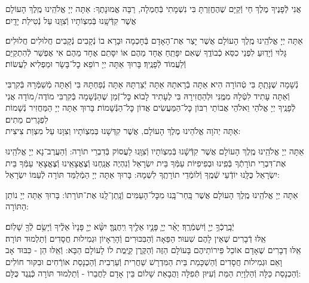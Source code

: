 \documentclass[twoside, openany, parskip=half, 11pt]{book}
\begin{document}
אֲנִי לְֿפָנֶיךָ מֶלֶךְ חַי וְֿקַיָּם שֶׁהֶחֱזַרְתָּ בִּי נִשְׁמָתִי בְּֿחֶמְלָה, רַבָּה אֱמוּנָתֶךָ:
אַתָּה יְיָ אֱלֹהֵֽינוּ מֶֽלֶךְ הָעוֹלָם אֲשֶׁר קִדְּֿשָֽׁנוּ בְּֿמִצְוֹתָיו וְֿצִוָּֽנוּ עַל נְֿטִילַת יָדָֽיִם׃

אַתָּה יְיָ אֱלֹהֵֽינוּ מֶֽלֶךְ הָעוֹלָם אֲשֶׁר יָצַר אֶת־הָאָדָם בְּֿחׇכְמָה וּבָרָא בוֹ נְֿקָבִים נְֿקָבִים חֲלוּלִים חֲלוּלִים׃ גָּלוּי וְֿיָדֽוּעַ לִפְנֵי כִסֵּא כְֿבוֹדֶֽךָ שֶׁאִם יִפָּתֵֽחַ אֶחָד מֵהֶם אוֹ יִסָּתֵם אֶחָד מֵהֶם אִי אֶפְשַׁר לְֿהִתְקַיֵּם וְֿלַעֲמוֹד לְֿפָנֶֽיךָ׃ בָּרוּךְ אַתָּה יְיָ רוֹפֵא כׇל־בָּשָׂר וּמַפְלִיא לַעֲשׂוֹת׃


נְֿשָׁמָה שֶׁנָּתַֽתָּ בִּי טְֿהוֹרָה הִיא׃ אַתָּה בְֿרָאתָהּ אַתָּה יְֿצַרְתָּהּ אַתָּה נְֿפַחְתָּהּ בִּי וְֿאַתָּה מְֿשַׁמְּֿרָהּ בְּֿקִרְבִּי וְֿאַתָּה עָתִיד לִטְּֿלָהּ מִמֶּֽנִּי וּלְהַחֲזִירָהּ בִּי לֶעָתִיד לָבוֹא׃ כׇּל־זְֿמַן שֶׁהַנְּֿשָׁמָה בְּֿקִרְבִּי מוֹדֶה/מוֹדָה אֲנִי לְֿפָנֶֽיךָ יְיָ אֱלֹהַי וֵאלֹהֵי אֲבוֹתַי רִבּוֹן כׇּל־הַמַּעֲשִׂים אֲדוֹן כׇּל־הַנְּֿשָׁמוֹת׃ בָּרוּךְ אַתָּה יְיָ הַמַּחֲזִיר נְֿשָׁמוֹת לִפְגָרִים מֵתִים׃\\
אַתָּה יְהֹוָה אֱלֹהֵינוּ מֶלֶךְ הָעוֹלָם, אֲשֶׁר קִדְּשָׁנוּ בְּמִצְוֹתָיו וְצִוָּנוּ עַל מִצְוַת צִיצִית:

אַתָּה יְיָ אֱלֹהֵֽינוּ מֶֽלֶךְ הָעוֹלָם אֲשֶׁר קִדְּֿשָֽֿׁנוּ בְּֿמִצְוֹתָיו וְֿצִוָּֽנוּ לַעֲסוֹק בְּֿדִבְרֵי תוֹרָה: וְֿהַעֲרֶב־נָא יְיָ אֱלֹהֵֽינוּ אֶת־דִּבְרֵי תוֹרָתְֿךָ בְּֿפִֽינוּ וּבְפִיפִיּוֹת עַמְּֿךָ בֵּית יִשְׂרָאֵל וְֿנִהְיֶה אֲנַֽחְנוּ וְֿצֶאֱצָאֵֽינוּ וְֿצֶאֱצָאֵי עַמְּֿךָ בֵּית יִשְׂרָאֵל כֻּלָּֽנוּ יוֹדְֿעֵי שְֿׁמֶֽךָ וְֿלוֹמְֿדֵי תוֹרָתֶֽךָ לִשְׁמָהּ: בָּרוּךְ אַתָּה יְיָ הַמְֿלַמֵּד תּוֹרָה לְֿעַמּוֹ יִשְׂרָאֵל:

אַתָּה יְיָ אֱלֹהֵֽינוּ מֶֽלֶךְ הָעוֹלָם אֲשֶׁר בָּֽחַר־בָּֽנוּ מִכׇּל־הָעַמִּים וְֿנָֽתַן־לָֽנוּ אֶת־תּוֹרָתוֹ: בָּרוּךְ אַתָּה יְיָ נוֹתֵן הַתּוֹרָה:



יְֿבָֽרֶכְֿךָ֥ יְיָ֖ וְֿיִשְׁמְֿרֶֽךָ׃ יָאֵ֨ר יְיָ֧ פָּנָ֛יו אֵלֶ֖יךָ וִֽיחֻנֶּֽךָּ׃ יִשָּׂ֨א יְיָ֤ פָּנָיו֙ אֵלֶ֔יךָ וְֿיָשֵׂ֥ם לְֿךָ֖ שָׁלֽוֹם׃\\
אֵֽלּוּ דְֿבָרִים שֶׁאֵין לָהֶם שִׁעוּר׃ הַפֵּאָה וְֿהַבִּכּוּרִים וְֿהָרֵאָיוֹן וּגְמִילוּת חֲסָדִים וְֿתַלְמוּד תּוֹרָה׃\\
אֵֽלּוּ דְבָרִים שֶׁאָדָם אוֹכֵל פֵּירוֹתֵיהֶם בָּעוֹלָם הַזֶּה וְֿהַקֶּֽרֶן קַיֶּֽמֶת לוֹ לָעוֹלָם הַבָּא: וְֿאֵֽלּוּ הֵן - כִּבּוּד אָב וָאֵם וּגְמִילוּת חֲסָדִים וְֿהַשְׁכָּמַת בֵּית הַמִּדְרָשׁ שַׁחֲרִית וְֿעַרְבִית וְֿהַכְנָסַת אוֹרְֿחִים וּבִקּוּר חוֹלִים וְֿהַכְנָסַת כַּלָּה וְֿהַלְוָיַת הַמֵּת וְֿעִיּוּן תְּֿפִלָּה וַהֲבָאַת שָׁלוֹם בֵּין אָדָם לַחֲבֵרוֹ - וְֿתַלְמוּד תּוֹרָה כְּֿנֶֽגֶד כֻּלָּם:
\end{document}
